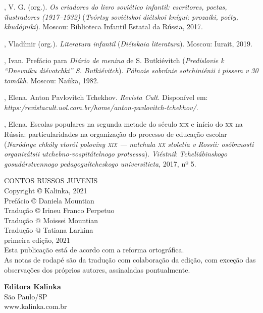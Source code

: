 \begin{bibliohedra}
, V. G. (org.). \textit{Os criadores do livro soviético infantil: escritores, poetas, ilustradores (1917–1932)} (\textit{Tvórtsy soviétskoi diétskoi knígui: prozaiki, poéty, khudójniki}). Moscou: Biblioteca Infantil Еstatal da Rússia, 2017.

, Vladímir (org.). \textit{Literatura infantil} (\textit{Diétskaia literatura}). Moscou: Iurait, 2019.

, Ivan. Prefácio para \textit{Diário de menina} de S. Butkiévitch (\textit{Predislovie k “Dnevniku diévotchki” S. Butkiévitch}). \textit{Pólnoie sobránie sotchiniénii i pissem v 30 tomákh}. Moscou: Naúka, 1982.

, Elena. Anton Pavlovitch Tchekhov. \textit{Revista Cult}. Disponível em:
\textit{https:/revistacult.uol.com.br/home/anton-pavlovitch-tchekhov/}.

, Elena. Escolas populares na segunda metade do século \textsc{xix} e início do \textsc{xx} na Rússia: particularidades na organização do processo de educação escolar (\textit{Naródnye chkóly vtorói polovíny \textsc{xix} — natchala \textsc{xx} stoletia v Rossii: osóbnnosti organizátsii utchebno-vospitátelnogo protsessa}). \textit{Viéstnik Tcheliábinskogo gosudárstvennogo pedagoguítcheskogo universitieta}, 2017, nº 5.
\end{bibliohedra}

\endgroup

\pagebreak
\thispagestyle{empty}
\movetooddpage
\thispagestyle{empty}

\begingroup\footnotesize

\vspace*{\fill}
\begin{flushright}
CONTOS RUSSOS JUVENIS\\[6pt]
Copyright © Kalinka, 2021\\[6pt]
Prefácio © Daniela Mountian\\[6pt]
Tradução © Irineu Franco Perpetuo\\[6pt]
Tradução @ Moissei Mountian\\[6pt]
Tradução @ Tatiana Larkina\\[20pt]

primeira edição, 2021\\[20pt]

Esta publicação está de acordo com a reforma ortográfica.\\[6pt]

As notas de rodapé são da tradução com colaboração da edição, com exceção das observações dos próprios autores, assinaladas pontualmente.\\[6pt]
\end{flushright}
\vspace*{\fill}

\vfill


\begin{flushright}
\textbf{Editora Kalinka}\\
São Paulo/SP\\
www.kalinka.com.br
\end{flushright}

\endgroup
